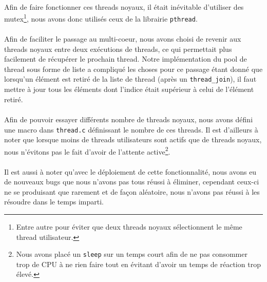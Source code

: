 \documentclass{article}
\begin{document}
        \paragraph{}
        Afin de faire fonctionner ces threads noyaux, il était inévitable
        d'utiliser des mutex\footnote{Entre autre pour éviter que deux
          threads noyaux sélectionnent le même thread utilisateur.}, nous
        avons donc utilisés ceux de la librairie \verb!pthread!. 
        \paragraph{}
        Afin de faciliter le passage au multi-coeur, nous avons choisi
        de revenir aux threads noyaux entre deux exécutions de threads, ce
        qui permettait plus facilement de récupérer le prochain thread. Notre
        implémentation du pool de thread sous forme de liste a compliqué les
        choses pour ce passage étant donné que lorsqu'un élément est retiré
        de la liste de thread (après un \verb!thread_join!), il faut mettre
        à jour tous les éléments dont l'indice était supérieur à celui de
        l'élément retiré.
        \paragraph{}
        Afin de pouvoir essayer différents nombre de threads noyaux, nous
        avons défini une macro dans \verb!thread.c! définissant le nombre
        de ces threads. Il est d'ailleurs à noter que lorsque moins de
        threads utilisateurs sont actifs que de threads noyaux, nous
        n'évitons pas le fait d'avoir de l'attente active\footnote{Nous avons
          placé un \verb!sleep! sur un temps court afin de ne pas consommer
          trop de CPU à ne rien faire tout en évitant d'avoir un temps de
          réaction trop élevé.}.
        \paragraph{}
        Il est aussi à noter qu'avec le déploiement de cette fonctionnalité,
        nous avons eu de nouveaux bugs que nous n'avons pas tous réussi à
        éliminer, cependant ceux-ci ne se produisant que rarement et de façon
        aléatoire, nous n'avons pas réussi à les résoudre dans le temps
        imparti.
\end{document}
